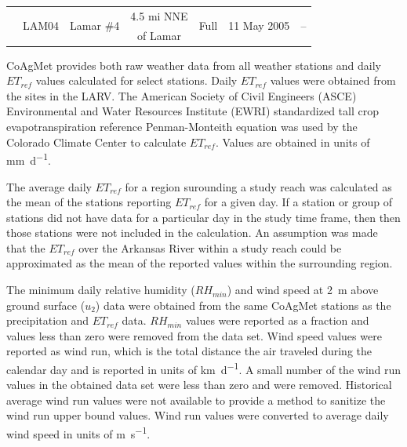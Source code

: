 \begin{linenumbers}
\begin{table}[htb]
\begin{tabular}{ccccccc}
    	     \cmidrule{2-7}      & \multirow{2}[0]{*}{LAM04} & \multirow{2}[0]{*}{Lamar \#4}  &   4.5 mi NNE   &  \multirow{2}[0]{*}{Full}   & \multirow{2}[0]{*}{11 May 2005} &  \multirow{2}[0]{*}{--}   \\
    	                         &                           &                                &    of Lamar    &                             &                                 &  \\
    \end{tabular}
\end{table}

CoAgMet provides both raw weather data from all weather stations and daily $ET_{ref}$ values calculated for select stations.  Daily $ET_{ref}$ values were obtained from the sites in the LARV.  The American Society of Civil Engineers (ASCE) Environmental and Water Resources Institute (EWRI) standardized tall crop evapotranspiration reference Penman-Monteith equation was used by the Colorado Climate Center to calculate $ET_{ref}$.  Values are obtained in units of \si{\milli\meter\per\day}.  

The average daily $ET_{ref}$ for a region surounding a study reach was calculated as the mean of the stations reporting $ET_{ref}$ for a given day. If a station or group of stations did not have data for a particular day in the study time frame, then then those stations were not included in the calculation.  An assumption was made that the $ET_{ref}$ over the Arkansas River within a study reach could be approximated as the mean of the reported values within the surrounding region.

The minimum daily relative humidity ($RH_{min}$) and wind speed at \SI{2}{\meter} above ground surface ($u_2$) data were obtained from the same CoAgMet stations as the precipitation and $ET_{ref}$ data.  $RH_{min}$ values were reported as a fraction and values less than zero were removed from the data set.  Wind speed values were reported as wind run, which is the total distance the air traveled during the calendar day and is reported in units of \si{\kilo\meter\per\day}.  A small number of the wind run values in the obtained data set were less than zero and were removed.  Historical average wind run values were not available to provide a method to sanitize the wind run upper bound values.  Wind run values were converted to average daily wind speed in units of \si{\meter\per\second}.


\end{linenumbers}
